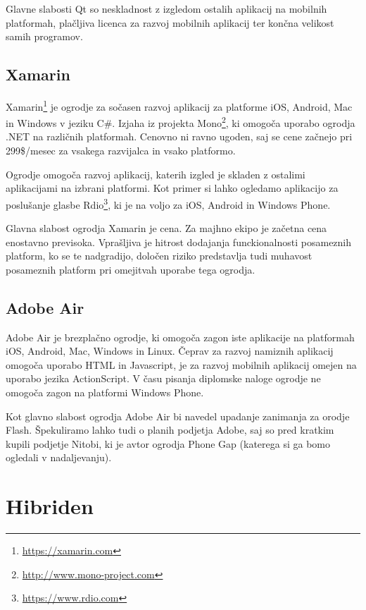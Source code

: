 Glavne slabosti Qt so neskladnost z izgledom ostalih aplikacij na mobilnih platformah, plačljiva licenca za razvoj mobilnih aplikacij ter končna velikost samih programov.

\subsection{Xamarin}

Xamarin\footnote{\href{https://xamarin.com}{https://xamarin.com}} je ogrodje za sočasen razvoj aplikacij za platforme iOS, Android, Mac in Windows v jeziku C\#. Izjaha iz projekta Mono\footnote{\href{http://www.mono-project.com}{http://www.mono-project.com}}, ki omogoča uporabo ogrodja .NET na različnih platformah. Cenovno ni ravno ugoden, saj se cene začnejo pri 299\$/mesec za vsakega razvijalca in vsako platformo.

Ogrodje omogoča razvoj aplikacij, katerih izgled je skladen z ostalimi aplikacijami na izbrani platformi. Kot primer si lahko ogledamo aplikacijo za poslušanje glasbe Rdio\footnote{\href{https://www.rdio.com}{https://www.rdio.com}}, ki je na voljo za iOS, Android in Windows Phone.

Glavna slabost ogrodja Xamarin je cena. Za majhno ekipo je začetna cena enostavno previsoka. Vprašljiva je hitrost dodajanja funckionalnosti posameznih platform, ko se te nadgradijo, določen riziko predstavlja tudi muhavost posameznih platform pri omejitvah uporabe tega ogrodja.

\subsection{Adobe Air}

Adobe Air je brezplačno ogrodje, ki omogoča zagon iste aplikacije na platformah iOS, Android, Mac, Windows in Linux. Čeprav za razvoj namiznih aplikacij omogoča uporabo HTML in Javascript, je za razvoj mobilnih aplikacij omejen na uporabo jezika ActionScript. V času pisanja diplomske naloge ogrodje ne omogoča zagon na platformi Windows Phone.

Kot glavno slabost ogrodja Adobe Air bi navedel upadanje zanimanja za orodje Flash. Špekuliramo lahko tudi o planih podjetja Adobe, saj so pred kratkim kupili podjetje Nitobi, ki je avtor ogrodja Phone Gap (katerega si ga bomo ogledali v nadaljevanju).

\section{Hibriden}

